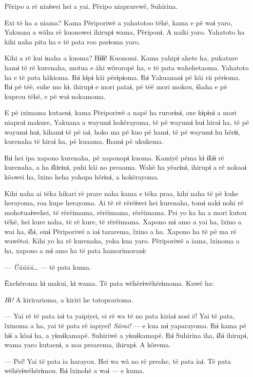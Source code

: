 Pẽripo a rë niaɨwei hei a yai, Pẽripo niaprarewë, Suhirina. 

Exi të ha a niama? Kama Pẽriporiwë a yahatotoo tëhë, kama e pë waɨ yaro,
Yakuana a wãha rë kuonowei ihirupɨ wama, Pẽriponɨ. A naiki yaro.
Yahatoto ha kihi naha pita ha e të pata roo parɨoma yaro. 

Kihi a rë kui ɨnaha a kuoma? Hɨ̃ɨɨ! Kuonomi. Kama yahipɨ ahete ha,
pukature hamɨ të rë kurenaha, motua e ãhi wõroropë ha, e të pata
wahehetaoma. Yahatoto ha e të pata hãkioma. Ɨhɨ kɨpɨ kãi përɨpɨoma. Ɨhɨ
Yakuananɨ pë kãi rii përɨoma. Ɨhɨ pë tëë, suhe mo kɨ, ihirupɨ e mori
pataɨ, pë tëë mori mokou, ɨ̃naha e pë kuprou tëhë, e pë waɨ nokamoma. 

E pë iximama kutaenɨ, kama Pẽriporiwë a napë ha rurorɨnɨ, oxe kɨpɨnɨ a
mori niapraɨ makure, Yakuana a wayumɨ hokërayoma, të pë wayumɨ huɨ hiraɨ
ha, të pë wayumɨ huɨ, kihamɨ të pë iaɨ, hoko ma pë kuo pë hamɨ, të pë
wayumɨ hu hërɨɨ, kurenaha të hiraɨ ha, pë kuaama. Ɨhamɨ pë ukukema. 

Ɨhɨ hei ipa xapono kurenaha, pë xaponopɨ kuoma. Kamiyë pëma kɨ ɨ̃kɨɨ rë
kurenaha, a ha ɨ̃kɨrɨnɨ, puhi kãi no preaama. Wakë ha yëarɨnɨ, ihirupɨ a
rë nokaaɨ kõowei ha, ĩxino heha yohopa hërɨnɨ, a hokërayoma. 

Kihi naha ai tëka hikari rë prare naha kama e tëka praa, kihi naha të pë
kuke herayoma, roa kupe herayoma. Ai të rë rërëɨwei hei kurenaha, tomɨ
nakɨ nohi rë mohotuaɨwehei, të rërëimama, rërëimama, rërëimama. Pei yo
ka ha a mori kutou tëhë, hei kure naha, të rë kure, të rërëimama. Xapono
mɨ amo a yai ha, ĩxino a wai ha, ɨ̃hɨ, einɨ Pẽriporiwë a iaɨ tararema,
ĩxino a ha. Xapono ha të pë ma rë wawëtoi. Kihi yo ka rë kurenaha, yoka
kua yaro. Pẽriporiwë a iama, ĩxinoma a ha, xapono a mɨ amo ha të pata
hamorimoranɨ: 

--- \textit{Ũũũũũ…} --- të pata kuma. 

Ẽxehẽroma kɨ makui, kɨ wama. Të pata wëhërɨwëhërɨmoma. Kuwë ha:

\textit{Hɨ!} A kirirarioma, a kiriri he tatoprarioma. 

--- Yai rë të pata iaɨ ta yaipiyei, ei rë wa të no pata kiriaɨ nosi ë!
Yai të pata, ĩxinoma a ha, yai të pata rë iapiyei! \textit{Sãrai!} --- e kua mɨ
yaparayoma. Ɨhɨ kama pë hɨɨ a kõaɨ ha, a yɨmɨkamapë. Suhiriwë a
yɨmɨkamapë. Ɨhɨ Suhirina iha, ɨ̃hɨ ihirupɨ, wama yaro kutaenɨ, a noa
prearema, ihirupɨ. A kõrema.

--- Pei! Yai të pata ia harayou. Hei wa wã no rë preohe, të pata iaɨ. Të
pata wëhërɨwëhërɨmou. Ɨhɨ ĩxinohë a waɨ --- e kuma. 

